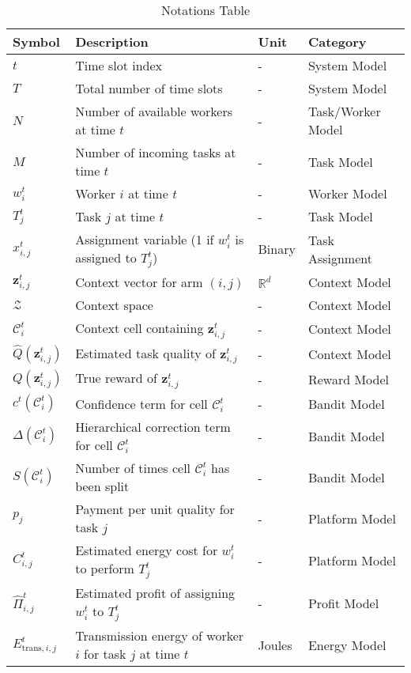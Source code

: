 \begin{table*}[t]
\centering
\scriptsize
\caption{Notations Table}
\label{tab:notations}
\begin{tabular}{llll}
\toprule
\textbf{Symbol} & \textbf{Description} & \textbf{Unit} & \textbf{Category} \\
\midrule
$t$ & Time slot index & - & System Model \\
$T$ & Total number of time slots & - & System Model \\
$N$ & Number of available workers at time $t$ & - & Task/Worker Model \\
$M$ & Number of incoming tasks at time $t$ & - & Task Model \\
$w_i^t$ & Worker $i$ at time $t$ & - & Worker Model \\
$T_j^t$ & Task $j$ at time $t$ & - & Task Model \\
$x_{i,j}^t$ & Assignment variable (1 if $w_i^t$ is assigned to $T_j^t$) & Binary & Task Assignment \\
$\mathbf{z}_{i,j}^t$ & Context vector for arm $(i,j)$ & $\mathbb{R}^d$ & Context Model \\
$\mathcal{Z}$ & Context space & - & Context Model \\
$\mathcal{C}_i^t$ & Context cell containing $\mathbf{z}_{i,j}^t$ & - & Context Model \\
$\hat{Q}(\mathbf{z}_{i,j}^t)$ & Estimated task quality of $\mathbf{z}_{i,j}^t$ & - & Context Model \\
$Q(\mathbf{z}_{i,j}^t)$ & True reward of $\mathbf{z}_{i,j}^t$ & - & Reward Model \\
$c^{t}(\mathcal{C}_i^t)$ & Confidence term for cell $\mathcal{C}_i^t$ & - & Bandit Model \\
$\Delta(\mathcal{C}_i^t)$ & Hierarchical correction term for cell $\mathcal{C}_i^t$ & - & Bandit Model \\
$S(\mathcal{C}_i^t)$ & Number of times cell $\mathcal{C}_i^t$ has been split & - & Bandit Model \\
$p_j$ & Payment per unit quality for task $j$ & - & Platform Model \\
$C_{i,j}^t$ & Estimated energy cost for $w_i^t$ to perform $T_j^t$ & - & Platform Model \\
$\hat{\Pi}_{i,j}^t$ & Estimated profit of assigning $w_i^t$ to $T_j^t$ & - & Profit Model \\
$E_{\text{trans},i,j}^t$ & Transmission energy of worker $i$ for task $j$ at time $t$ & Joules & Energy Model \\

\end{tabular}
\end{table*}
